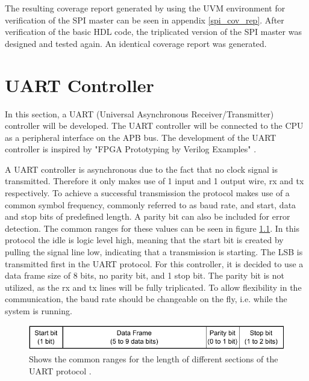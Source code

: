 \documentclass[./dissertation.tex]{subfiles}
\begin{document}
The resulting coverage report generated by using the UVM environment for verification of the SPI master can be seen in appendix \ref{spi_cov_rep}. After verification of the basic HDL code, the triplicated version of the SPI master was designed and tested again. An identical coverage report was generated. 







\chapter{UART Controller}
\label{uart_sec}
In this section, a UART (Universal Asynchronous Receiver/Transmitter) controller will be developed. The UART controller will be connected to the CPU as a peripheral interface on the APB bus. The development of the UART controller is inspired by "FPGA Prototyping by Verilog Examples" \cite{FPGAprototyping}. 

A UART controller is asynchronous due to the fact that no clock signal is transmitted. Therefore it only makes use of 1 input and 1 output wire, rx and tx respectively. To achieve a successful transmission the protocol makes use of a common symbol frequency, commonly referred to as baud rate, and start, data and stop bits of predefined length. A parity bit can also be included for error detection. The common ranges for these values can be seen in figure \ref{fig:uart_signals}. In this protocol the idle is logic level high, meaning that the start bit is created by pulling the signal line low, indicating that a transmission is starting. The LSB is transmitted first in the UART protocol. For this controller, it is decided to use a data frame size of 8 bits, no parity bit, and 1 stop bit. The parity bit is not utilized, as the rx and tx lines will be fully triplicated. To allow flexibility in the communication, the baud rate should be changeable on the fly, i.e. while the system is running.     

\begin{figure}[H]
    \centering
    \includegraphics[width = \linewidth]{subfiles/imgs/IP_Blocks_Pics/uart_signals.drawio.pdf}
    \caption{Shows the common ranges for the length of different sections of the UART protocol \cite{AnalogUART}.}
    \label{fig:uart_signals}
\end{figure}
\end{document}
